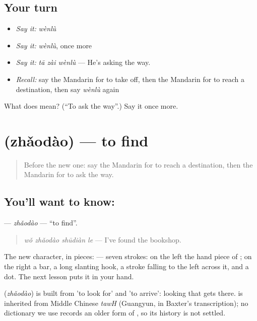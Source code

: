 \subsection*{Your turn}
\begin{itemize}
\raggedright
  \item \emph{Say it:} \emph{wènlù}
  \item \emph{Say it:} \emph{wènlù}, once more
  \item \emph{Say it:} \emph{tā zài wènlù} — He's asking the way.
  \item \emph{Recall:} say the Mandarin for to take off, then the Mandarin for to reach a destination, then say \emph{wènlù} again
\end{itemize}

\begin{tcolorbox}[breakable,colback=teal!4,colframe=teal!35!black,title={Before you move on}]
What does  mean? (\textquotedblleft{}To ask the way\textquotedblright{}.) Say it once more.
\end{tcolorbox}
\section[\texorpdfstring{\zh{找到} (zhǎodào)}{找到 (zhǎodào)}]{ (zhǎodào) — to find}

\label{lesson:ZH-C197-zhaodao}



\begin{quote}
Before the new one: say the Mandarin for to reach a destination, then the Mandarin for to ask the way.
\end{quote}

\subsection*{You'll want to know: }
\textbf{} — \emph{zhǎodào} — \textquotedblleft{}to find\textquotedblright{}.

\begin{quote}
\textbf{} \emph{wǒ zhǎodào shūdiàn le} — I've found the bookshop.
\end{quote}

The new character, in pieces:  — seven strokes: on the left the hand piece of ; on the right a bar, a long slanting hook, a stroke falling to the left across it, and a dot. The next lesson puts it in your hand.

\begin{cousinweb}
\textbf{} (\emph{zhǎodào}) is built from  'to look for' and  'to arrive': looking that gets there.  is inherited from Middle Chinese \emph{tawH} (Guangyun, in Baxter's transcription); no dictionary we use records an older form of , so its history is not settled.
\end{cousinweb}

